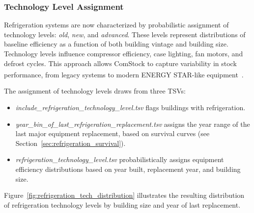 \subsubsection{Technology Level Assignment}
Refrigeration systems are now characterized by probabilistic assignment of technology levels: \textit{old}, \textit{new}, and \textit{advanced}. These levels represent distributions of baseline efficiency as a function of both building vintage and building size. Technology levels influence compressor efficiency, case lighting, fan motors, and defrost cycles. This approach allows ComStock to capture variability in stock performance, from legacy systems to modern ENERGY STAR\textsuperscript{\textregistered}-like equipment~\citep{DOE_TSD_2009,ENERGYSTAR_Refrigeration}.

The assignment of technology levels draws from three TSVs:
\begin{itemize}
    \item \textit{include\_refrigeration\_technology\_level.tsv} flags buildings with refrigeration.
    \item \textit{year\_bin\_of\_last\_refrigeration\_replacement.tsv} assigns the year range of the last major equipment replacement, based on survival curves (see Section~\ref{sec:refrigeration_survival}).
    \item \textit{refrigeration\_technology\_level.tsv} probabilistically assigns equipment efficiency distributions based on year built, replacement year, and building size.
\end{itemize}


Figure~\ref{fig:refrigeration_tech_distribution} illustrates the resulting distribution of refrigeration technology levels by building size and year of last replacement.

